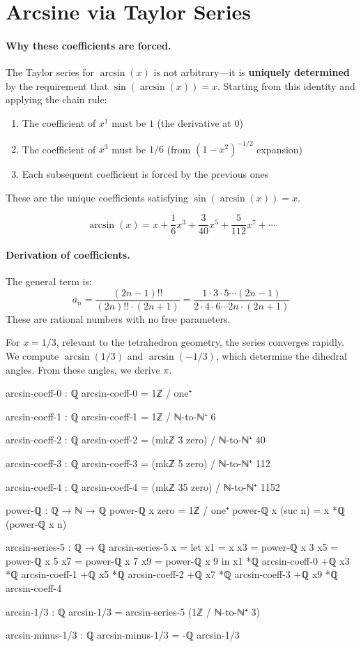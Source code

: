\documentclass[11pt,a4paper]{book}
\begin{document}
\section{Arcsine via Taylor Series}

\paragraph{Why these coefficients are forced.}

The Taylor series for $\arcsin(x)$ is not arbitrary—it is \textbf{uniquely determined} by 
the requirement that $\sin(\arcsin(x)) = x$. Starting from this identity and applying the 
chain rule:
\begin{enumerate}
\item The coefficient of $x^1$ must be $1$ (the derivative at 0)
\item The coefficient of $x^3$ must be $1/6$ (from $(1-x^2)^{-1/2}$ expansion)
\item Each subsequent coefficient is forced by the previous ones
\end{enumerate}

These are the unique coefficients satisfying $\sin(\arcsin(x)) = x$.

\[
\arcsin(x) = x + \frac{1}{6}x^3 + \frac{3}{40}x^5 + \frac{5}{112}x^7 + \cdots
\]

\paragraph{Derivation of coefficients.}
The general term is:
\[
a_n = \frac{(2n-1)!!}{(2n)!! \cdot (2n+1)} = \frac{1 \cdot 3 \cdot 5 \cdots (2n-1)}{2 \cdot 4 \cdot 6 \cdots 2n \cdot (2n+1)}
\]
These are rational numbers with no free parameters.

For $x = 1/3$, relevant to the tetrahedron geometry, the series converges rapidly. We compute $\arcsin(1/3)$ and $\arcsin(-1/3)$, which determine the dihedral angles. From these angles, we derive $\pi$.

\begin{code}
arcsin-coeff-0 : ℚ
arcsin-coeff-0 = 1ℤ / one⁺

arcsin-coeff-1 : ℚ  
arcsin-coeff-1 = 1ℤ / ℕ-to-ℕ⁺ 6

arcsin-coeff-2 : ℚ
arcsin-coeff-2 = (mkℤ 3 zero) / ℕ-to-ℕ⁺ 40

arcsin-coeff-3 : ℚ
arcsin-coeff-3 = (mkℤ 5 zero) / ℕ-to-ℕ⁺ 112

arcsin-coeff-4 : ℚ
arcsin-coeff-4 = (mkℤ 35 zero) / ℕ-to-ℕ⁺ 1152

power-ℚ : ℚ → ℕ → ℚ
power-ℚ x zero = 1ℤ / one⁺
power-ℚ x (suc n) = x *ℚ (power-ℚ x n)

arcsin-series-5 : ℚ → ℚ
arcsin-series-5 x = 
  let x1 = x
      x3 = power-ℚ x 3
      x5 = power-ℚ x 5
      x7 = power-ℚ x 7
      x9 = power-ℚ x 9
  in x1 *ℚ arcsin-coeff-0
   +ℚ x3 *ℚ arcsin-coeff-1
   +ℚ x5 *ℚ arcsin-coeff-2
   +ℚ x7 *ℚ arcsin-coeff-3
   +ℚ x9 *ℚ arcsin-coeff-4

arcsin-1/3 : ℚ
arcsin-1/3 = arcsin-series-5 (1ℤ / ℕ-to-ℕ⁺ 3)

arcsin-minus-1/3 : ℚ
arcsin-minus-1/3 = -ℚ arcsin-1/3
\end{code}
\end{document}
